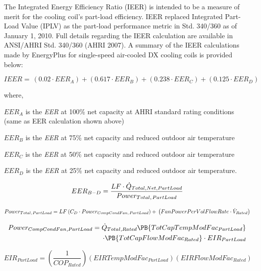 The Integrated Energy Efficiency Ratio (IEER) is intended to be a measure of merit for the cooling coil's part-load efficiency. IEER replaced Integrated Part-Load Value (IPLV) as the part-load performance metric in Std. 340/360 as of January 1, 2010. Full details regarding the IEER calculation are available in ANSI/AHRI Std. 340/360 (AHRI 2007). A summary of the IEER calculations made by EnergyPlus for single-speed air-cooled DX cooling coils is provided below:

\begin{equation}
IEER = \,(0.02 \cdot EE{R_A}) + (0.617 \cdot EE{R_B}) + (0.238 \cdot EE{R_C}) + (0.125 \cdot EE{R_D})
\end{equation}

where,

\(EE{R_A}\) is the \emph{EER} at 100\% net capacity at AHRI standard rating conditions (same as EER calculation shown above)

\(EE{R_B}\) is the \emph{EER} at 75\% net capacity and reduced outdoor air temperature

\(EE{R_C}\) is the \emph{EER} at 50\% net capacity and reduced outdoor air temperature

\(EE{R_D}\) is the \emph{EER} at 25\% net capacity and reduced outdoor air temperature.

\begin{equation}
EE{R_{B - D}} = \frac{{LF \cdot {{\dot Q}_{Total,Net,PartLoad}}}}{{Powe{r_{Total,{\kern 1pt} PartLoad}}}}
\end{equation}

\begin{equation}
Powe{r_{Total,{\kern 1pt} PartLoad}} = LF\left( {{C_D} \cdot Powe{r_{CompCondFan,{\kern 1pt} PartLoad}}} \right) + \,\left( {FanPowerPerVolFlowRate \cdot {{\dot V}_{Rated}}} \right)
\end{equation}

\begin{equation}
\begin{split}
Power_{CompCondFan,PartLoad} = \dot{Q}_{Total,Rated}\PB{TotCapTempModFac_{PartLoad}} \\
\cdot \PB{TotCapFlowModFac_{Rated}} \cdot EIR_{PartLoad}
\end{split}
\end{equation}

\begin{equation}
EI{R_{PartLoad}} = \left( {\frac{1}{{CO{P_{Rated}}}}} \right)(EIRTempModFa{c_{PartLoad}})(EIRFlowModFa{c_{Rated}})
\end{equation}

